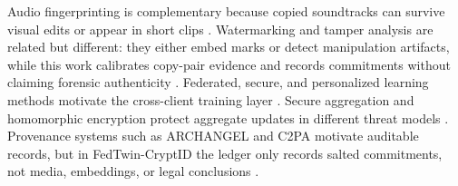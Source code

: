\documentclass[journal]{IEEEtran}
\newcommand{\ours}{FedTwin-CryptID}
\begin{document}
Audio fingerprinting is complementary because copied soundtracks can survive visual edits or appear in short clips \cite{wang2003shazam,cano2005review,baluja2008waveprint}. Watermarking and tamper analysis are related but different: they either embed marks or detect manipulation artifacts, while this work calibrates copy-pair evidence and records commitments without claiming forensic authenticity \cite{cayre2005watermarking,cox2007watermarking,sitara2018digital}. Federated, secure, and personalized learning methods motivate the cross-client training layer \cite{mcmahan2017fedavg,kairouz2021advances,li2020fedprox,karimireddy2020scaffold,reddi2021fedopt,li2021ditto}. Secure aggregation and homomorphic encryption protect aggregate updates in different threat models \cite{bonawitz2017secureagg,paillier1999public,cheon2017ckks,acar2018surveyhe}. Provenance systems such as ARCHANGEL and C2PA motivate auditable records, but in \ours{} the ledger only records salted commitments, not media, embeddings, or legal conclusions \cite{bui2020archangel,c2pa2026spec}.
\end{document}
